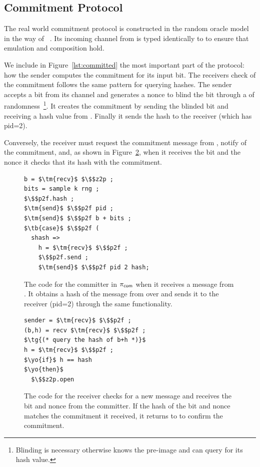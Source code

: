 \subsection{Commitment Protocol}
The real world commitment protocol is constructed in the random oracle model in the way of ~\cite{hofheinz}.
Its incoming channel from \Z is typed identically to \Fcom to ensure that emulation and composition hold.

We include in Figure~\ref{lst:committed} the most important part of the protocol: how the sender computes the commitment for its input bit. The receivers check of the commitment follows the same pattern for querying hashes. 
The sender accepts a bit from its  channel and generates a nonce to blind the bit through a  of randomness~\footnote{Blinding is necessary otherwise \A knows the pre-image and can query \Fro for its hash value.}.
It creates the commitment by sending \Fropp the blinded bit and receiving a hash value from .
Finally it sends the hash to the receiver (which has pid=2).

Conversely, the receiver must request the commitment  message from \Fropp, notify \Z of the commitment, and, as shown in Figure~\ref{lst:receiver}, when it receives the bit and the nonce it checks that its hash with the commitment.
\begin{figure}
\begin{lstlisting}[basicstyle=\footnotesize\BeraMonottFamily, frame=single, mathescape]
b = $\tm{recv}$ $\$$z2p ;
bits = sample k rng ;
$\$$p2f.hash ;
$\tm{send}$ $\$$p2f pid ;
$\tm{send}$ $\$$p2f b + bits ;
$\tb{case}$ $\$$p2f (
  shash => 
    h = $\tm{recv}$ $\$$p2f ;
    $\$$p2f.send ;
    $\tm{send}$ $\$$p2f pid 2 hash;
\end{lstlisting}
\caption{The code for the committer in $\pi_{{\mathsf {com}}}$ when it receives a  message from \Z. It obtains a hash of the message from \Fropp over  and sends it to the receiver (pid=2) through the same functionality.}
\label{lst:committer}
\end{figure}
\begin{figure}
\begin{lstlisting}[basicstyle=\footnotesize\BeraMonottFamily, frame=single, mathescape]
sender = $\tm{recv}$ $\$$p2f ;
(b,h) = recv $\tm{recv}$ $\$$p2f ;
$\tg{(* query the hash of b+h *)}$
h = $\tm{recv}$ $\$$p2f ;
$\yo{if}$ h == hash
$\yo{then}$
  $\$$z2p.open
\end{lstlisting}
\caption{The code for the receiver checks for a new message and receives the bit and nonce from the committer. If the hash of the bit and nonce matches the commitment it received, it returns  to \Z to confirm the commitment.}
\label{lst:receiver}
\end{figure}

